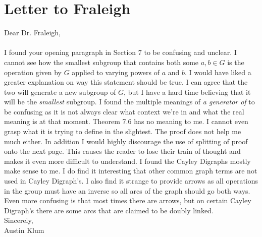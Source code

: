 \documentclass[11pt]{article}
\theoremstyle{plain}
\theoremstyle{definition}
\begin{document}
\section{Letter to Fraleigh}
Dear Dr. Fraleigh,\\
\\
I found your opening paragraph in Section 7 to be confusing and unclear. I cannot see how the smallest subgroup that contains both some $ a,b \in G $ is the operation given by $ G $ applied to varying powers of $ a $ and $ b $. I would have liked a greater explanation on way this statement should be true. I can agree that the two will generate a new subgroup of $ G $, but I have a hard time believing that it will be the \textit{smallest} subgroup. I found the multiple meanings of \textit{a generator of } to be confusing as it is not always clear what context we're in and what the real meaning is at that moment. Theorem 7.6 has no meaning to me. I cannot even grasp what it is trying to define in the slightest. The proof does not help me much either. In addition I would highly discourage the use of splitting of proof onto the next page. This causes the reader to lose their train of thought and makes it even more difficult to understand. I found the Cayley Digraphs mostly make sense to me. I do find it interesting that other common graph terms are not used in Cayley Digraph's. I also find it strange to provide arrows as all operations in the group must have an inverse so all arcs of the graph should go both ways. Even more confusing is that most times there are arrows, but on certain Cayley Digraph's there are some arcs that are claimed to be doubly linked.
\\
Sincerely,\\
Austin Klum
\end{document}

